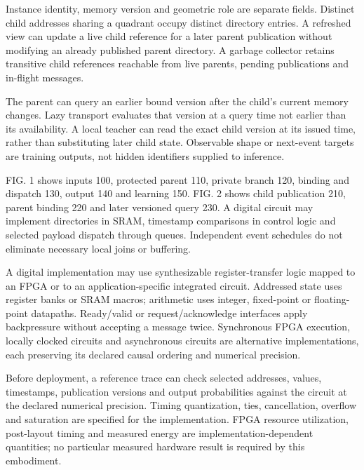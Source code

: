 \documentclass[pct]{sm-patent}
\begin{document}
\pnum Instance identity, memory version and geometric role are separate fields. Distinct child addresses sharing a quadrant occupy distinct directory entries. A refreshed view can update a live child reference for a later parent publication without modifying an already published parent directory. A garbage collector retains transitive child references reachable from live parents, pending publications and in-flight messages.

\pnum The parent can query an earlier bound version after the child's current memory changes. Lazy transport evaluates that version at a query time not earlier than its availability. A local teacher can read the exact child version at its issued time, rather than substituting later child state. Observable shape or next-event targets are training outputs, not hidden identifiers supplied to inference.

\pnum FIG. 1 shows inputs 100, protected parent 110, private branch 120, binding and dispatch 130, output 140 and learning 150. FIG. 2 shows child publication 210, parent binding 220 and later versioned query 230. A digital circuit may implement directories in SRAM, timestamp comparisons in control logic and selected payload dispatch through queues. Independent event schedules do not eliminate necessary local joins or buffering.


\pnum A digital implementation may use synthesizable register-transfer logic mapped to an FPGA or to an application-specific integrated circuit. Addressed state uses register banks or SRAM macros; arithmetic uses integer, fixed-point or floating-point datapaths. Ready/valid or request/acknowledge interfaces apply backpressure without accepting a message twice. Synchronous FPGA execution, locally clocked circuits and asynchronous circuits are alternative implementations, each preserving its declared causal ordering and numerical precision.

\pnum Before deployment, a reference trace can check selected addresses, values, timestamps, publication versions and output probabilities against the circuit at the declared numerical precision. Timing quantization, ties, cancellation, overflow and saturation are specified for the implementation. FPGA resource utilization, post-layout timing and measured energy are implementation-dependent quantities; no particular measured hardware result is required by this embodiment.

\claimsstart
\end{document}
